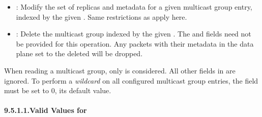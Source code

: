 \documentclass[11pt]{article}
\begin{document}
{\begin{itemize}[noitemsep,topsep=\mdcompacttopsep]
\item{}: Modify the set of replicas and metadata for a given multicast group
entry, indexed by the given . Same restrictions as
 apply here.%

\item{}: Delete the multicast group indexed by the given
. The  and  fields need not be
provided for this operation. Any packets with their 
metadata in the data plane set to the deleted  will be
dropped.%
\end{itemize}%

\noindent{}When reading a multicast group, only  is considered. All
other fields in  are ignored. To perform a \emph{wildcard}
 on all configured multicast group entries, the  field
must be set to 0, its default value.%

\paragraph{9.5.1.1.\hspace*{0.5em}Valid Values for }\label{sec-valid-values-for-mg-id}%

}
\end{document}

